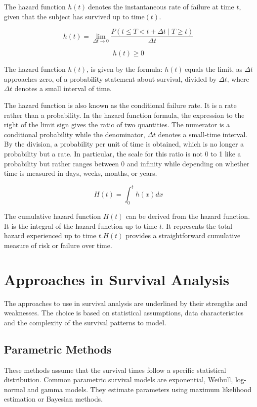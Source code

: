 \documentclass[doublespacing]{report} %
\begin{document}
The hazard function \( h(t)\ \)denotes the instantaneous rate of failure at time \(t\), given that the subject has survived up to time\( (t).\)

\[
h(t) = \lim_{\Delta t \to 0} \frac{P(t \le T < t + \Delta t \mid T \geq t)}{\Delta t}
\]

\[h\left(t\right)\geq0\]


The hazard function \( h\left(t\right)\), is given by the formula: \(h\left(t\right)\ \)equals the limit, as \(\Delta t \) approaches zero, of a probability statement about survival, divided by \(\Delta t\), where \(\Delta t\) denotes a small interval of time.

The hazard function is also known as the conditional failure rate. It is a rate rather than a probability. In the hazard function formula, the expression to the right of the limit sign gives the ratio of two quantities. The numerator is a conditional probability while the denominator, \(\Delta t\) denotes a small-time interval. By the division, a probability per unit of time is obtained, which is no longer a probability but a rate. In particular, the scale for this ratio is not 0 to 1 like a probability but rather ranges between 0 and infinity while depending on whether time is measured in days, weeks, months, or years. 

\[H(t)=\int_{0}^{t}{h(x)dx}\]

The cumulative hazard function \(H(t)\) can be derived from the hazard function. It is the integral of the hazard function up to time \(t\). It represents the total hazard experienced up to time \( t. H(t)\) provides a straightforward cumulative measure of risk or failure over time.

\section{Approaches in Survival Analysis}

The approaches to use in survival analysis are underlined by their strengths and weaknesses. The choice is based on statistical assumptions, data characteristics and the complexity of the survival patterns to model.

\subsection{Parametric Methods}

These methods assume that the survival times follow a specific statistical distribution. Common parametric survival models are exponential, Weibull, log-normal and gamma models. They estimate parameters using maximum likelihood estimation or Bayesian methods.
\end{document}

